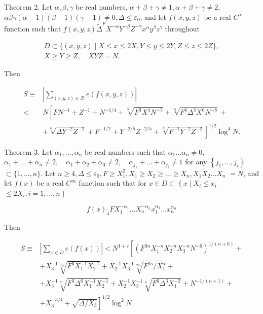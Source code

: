 \documentclass[10pt]{article}
\begin{document}
Theorem 2. Let $\alpha, \beta, \gamma$ be real numbers, $\alpha+\beta+\gamma \neq 1, \alpha+\beta+\gamma \neq 2$, $\alpha \beta \gamma(\alpha-1)(\beta-1)(\gamma-1) \neq 0, \Delta \leqslant \varepsilon_{0}$, and let $f(x, y, z)$ be a real $C^{\alpha}$ function such that $f(x, y, z) \widetilde{\Delta}^{F} X^{-\alpha} Y^{-\beta} Z^{-\gamma} x^{\alpha} y^{\beta} z^{\gamma}$ throughout

$$
\begin{gathered}
D \subset\{(x, y, z) \mid X \leqslant x \leqslant 2 X, Y \leqslant y \leqslant 2 Y, Z \leqslant z \leqslant 2 Z\}, \\
X \geqslant Y \geqslant Z, \quad X Y Z=N .
\end{gathered}
$$

Then

$$
\begin{aligned}
S \equiv & \left|\sum_{(x, y, z) \in \mathscr{D}} e(f(x, y, z))\right| \\
< & N\left[F N^{-1}+Z^{-1}+N^{-1 / 4}+\sqrt[5]{F^{3} X^{4} N^{-5}}+\sqrt[8]{F^{6} \Delta^{3} X^{6} N^{-8}}+\right. \\
& \left.+\sqrt[6]{\Delta Y^{-2} Z^{-2}}+F^{-1 / 2}+Y^{-2 / 5} Z^{-2 / 5}+\sqrt[8]{F^{-1} Y^{-2} Z^{-2}}\right]^{1 / 2} \log ^{4} N .
\end{aligned}
$$

Theorem 3. Let $\alpha_{1}, \ldots, \alpha_{n}$ be real numbers such that $\alpha_{1} \ldots \alpha_{n} \neq 0$, $\alpha_{1}+\ldots+\alpha_{n} \neq 2, \quad \alpha_{1}+\alpha_{2}+\alpha_{3} \neq 2, \quad \alpha_{j_{1}}+\ldots+\alpha_{j_{i}} \neq 1$ for any $\left\{j_{1}, \ldots, j_{i}\right\}$ $\subset\{1, \ldots, n\}$. Let $n \geqslant 4, \Delta \leqslant \varepsilon_{0}, F \geqslant X_{1}^{2}, X_{1} \geqslant X_{2} \geqslant \ldots \geqslant X_{n}, X_{1} X_{2} \ldots X_{n}$ $=N$, and let $f(x)$ be a real $C^{\infty}$ function such that for $x \in D \subset\left\{x \mid X_{i} \leqslant x_{i}\right.$ $\left.\leqslant 2 X_{i}, i=1, \ldots, n\right\}$

$$
f(x)_{\widetilde{4}} F X_{1}^{-\alpha_{1}} \ldots X_{n}^{-\alpha_{n}} x_{1}^{\alpha_{1}} \ldots x_{n}^{\alpha_{n}}
$$

Then

$$
\begin{aligned}
S \equiv & \left|\sum_{x \in D} e(f(x))\right|<N^{1+\varepsilon}\left[\left(F^{3 n} X_{1}^{-n} X_{2}^{-n} X_{3}^{-n} N^{-6}\right)^{1 /(n+6)}+\right. \\
& +X_{3}^{-1} \sqrt[19]{F^{3} X_{1}^{-1} X_{2}^{-1}}+X_{2}^{-1} X_{3}^{-1} \sqrt[23]{F^{15} / X_{1}^{5}}+ \\
& +X_{3}^{-1} \sqrt[7]{F^{3} \Delta^{6} X_{1}^{-1} X_{2}^{-1}}+X_{2}^{-1} X_{3}^{-1} \sqrt[8]{F^{6} \Delta^{3} X_{1}^{-2}}+N^{-1 /(n+1)}+ \\
& \left.+X_{3}^{-3 / 4}+\sqrt{\Delta / X_{3}}\right]^{1 / 2} \log ^{2} N
\end{aligned}
$$
\end{document}
